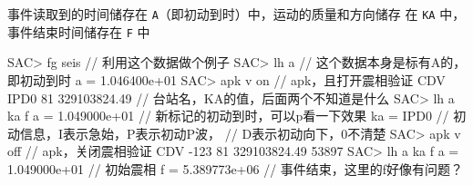 事件读取到的时间储存在 \texttt{A}（即初动到时）中，运动的质量和方向储存
在 \texttt{KA} 中，事件结束时间储存在 \texttt{F} 中

\begin{SACCode}
SAC> fg seis                // 利用这个数据做个例子
SAC> lh a                   // 这个数据本身是标有A的，即初动到时
     a = 1.046400e+01
SAC> apk v on               // apk，且打开震相验证
 CDV IPD0 81 329103824.49   // 台站名，KA的值，后面两个不知道是什么
SAC> lh a ka f
      a = 1.049000e+01      // 新标记的初动到时，可以p看一下效果
     ka = IPD0              // 初动信息，I表示急始，P表示初动P波，
                            // D表示初动向下，0不清楚
SAC> apk v off              // apk，关闭震相验证
 CDV -123 81 329103824.49   53897
SAC> lh a ka f
     a = 1.049000e+01       // 初始震相
     f = 5.389773e+06       // 事件结束，这里的f好像有问题？
\end{SACCode}
